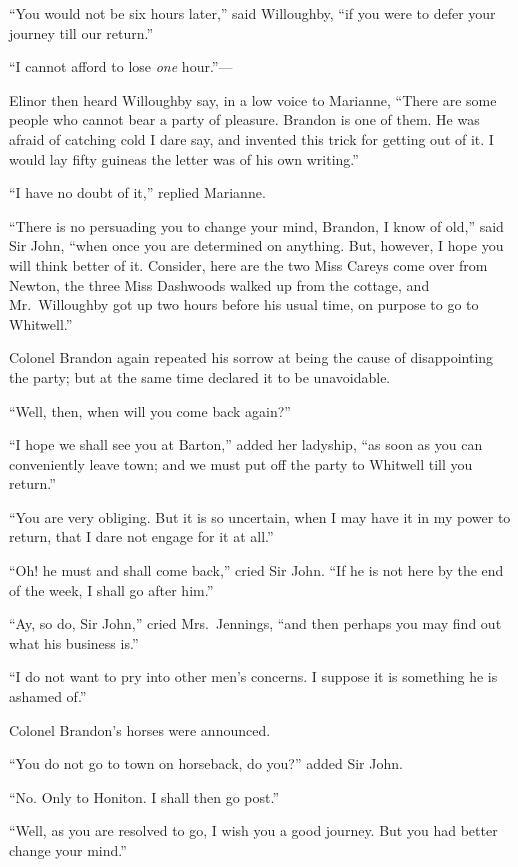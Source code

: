 ``You would not be six hours later,'' said Willoughby,
``if you were to defer your journey till our return.''

``I cannot afford to lose \emph{one} hour.''---%

Elinor then heard Willoughby say, in a low voice to Marianne,
``There are some people who cannot bear a party of pleasure.
Brandon is one of them.  He was afraid of catching cold
I dare say, and invented this trick for getting out of it.
I would lay fifty guineas the letter was of his own writing.''

``I have no doubt of it,'' replied Marianne.

``There is no persuading you to change your mind,
Brandon, I know of old,'' said Sir John, ``when once you
are determined on anything.  But, however, I hope you
will think better of it.  Consider, here are the two Miss
Careys come over from Newton, the three Miss Dashwoods
walked up from the cottage, and Mr.\ Willoughby got up
two hours before his usual time, on purpose to go to Whitwell.''

Colonel Brandon again repeated his sorrow at being
the cause of disappointing the party; but at the same
time declared it to be unavoidable.

``Well, then, when will you come back again?''

``I hope we shall see you at Barton,'' added her ladyship,
``as soon as you can conveniently leave town; and we must
put off the party to Whitwell till you return.''

``You are very obliging.  But it is so uncertain,
when I may have it in my power to return, that I dare
not engage for it at all.''

``Oh! he must and shall come back,'' cried Sir John.
``If he is not here by the end of the week, I shall go
after him.''

``Ay, so do, Sir John,'' cried Mrs.\ Jennings, ``and then
perhaps you may find out what his business is.''

``I do not want to pry into other men's concerns.
I suppose it is something he is ashamed of.''

Colonel Brandon's horses were announced.

``You do not go to town on horseback, do you?''
added Sir John.

``No. Only to Honiton.  I shall then go post.''

``Well, as you are resolved to go, I wish you
a good journey.  But you had better change your mind.''

